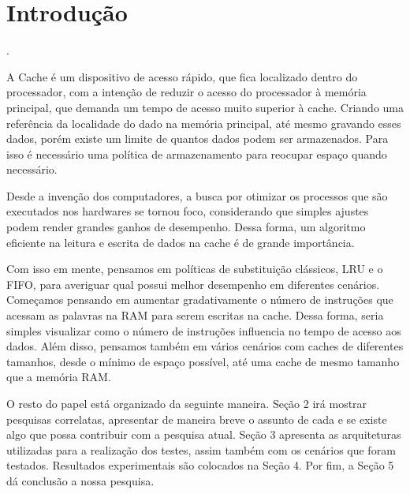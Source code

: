 \section{Introdução}


    \cite{Sibgrapi2021}.

    A Cache é um dispositivo de acesso rápido, que fica localizado dentro do processador,
    com a intenção de reduzir o acesso do processador à memória principal, que demanda um
    tempo de acesso muito superior à cache. Criando uma referência da localidade do dado na 
    memória principal, até mesmo gravando esses dados, porém existe um limite de quantos 
    dados podem ser armazenados. Para isso é necessário uma política de armazenamento para 
    reocupar espaço quando necessário.

    Desde a invenção dos computadores, a busca por otimizar os processos que são executados 
    nos hardwares se tornou foco, considerando que simples ajustes podem render grandes 
    ganhos de desempenho. Dessa forma, um algoritmo eficiente na leitura e escrita de 
    dados na cache é de grande importância. 

    Com isso em mente, pensamos em políticas de substituição clássicos, LRU e o FIFO, para
    averiguar qual possui melhor desempenho em diferentes cenários. Começamos pensando em 
    aumentar gradativamente o número de instruções que acessam as palavras na RAM para serem 
    escritas na cache. Dessa forma, seria simples visualizar como o número de instruções
    influencia no tempo de acesso aos dados. Além disso, pensamos também em vários cenários 
    com caches de diferentes tamanhos, desde o mínimo de espaço possível, até uma cache 
    de mesmo tamanho que a memória RAM.

    O resto do papel está organizado da seguinte maneira. Seção 2 irá mostrar pesquisas correlatas,
    apresentar de maneira breve o assunto de cada e se existe algo que possa contribuir com a pesquisa atual.
    Seção 3 apresenta as arquiteturas utilizadas para a realização dos testes, assim também com os cenários 
    que foram testados. Resultados experimentais são colocados na Seção 4. Por fim, a Seção 5 dá conclusão 
    a nossa pesquisa.